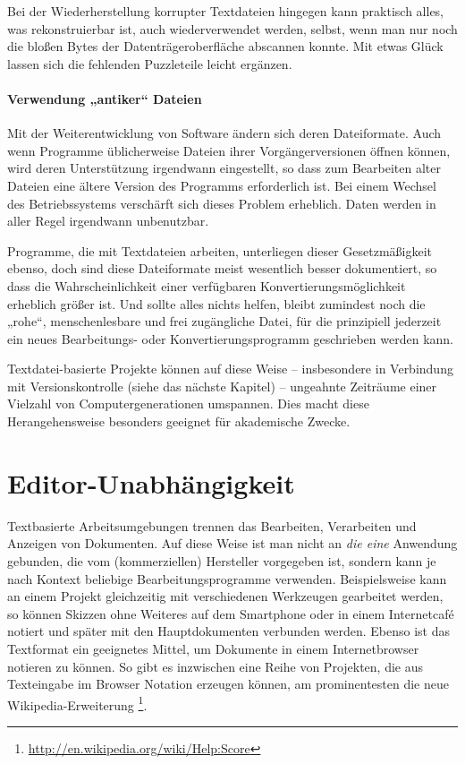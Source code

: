 \documentclass[DIV=12]{scrreprt}
\begin{document}
Bei der Wiederherstellung korrupter Textdateien hingegen kann praktisch alles, was rekonstruierbar ist, auch wiederverwendet werden, selbst, wenn man nur noch die bloßen Bytes der Datenträgeroberfläche abscannen konnte.
Mit etwas Glück lassen sich die fehlenden Puzzleteile leicht ergänzen.

\paragraph{Verwendung „antiker“ Dateien}
Mit der Weiterentwicklung von Software ändern sich deren Dateiformate.
Auch wenn Programme üblicherweise Dateien ihrer Vorgängerversionen öffnen können, wird deren Unterstützung irgendwann eingestellt, so dass zum Bearbeiten alter Dateien eine ältere Version des Programms erforderlich ist.
Bei einem Wechsel des Betriebssystems verschärft sich dieses Problem erheblich.
Daten werden in aller Regel irgendwann unbenutzbar.

Programme, die mit Textdateien arbeiten, unterliegen dieser Gesetzmäßigkeit ebenso, doch sind diese Dateiformate meist wesentlich besser dokumentiert, so dass die Wahrscheinlichkeit einer verfügbaren Konvertierungsmöglichkeit erheblich größer ist.
Und sollte alles nichts helfen, bleibt zumindest noch die „rohe“, menschenlesbare und frei zugängliche Datei, für die prinzipiell jederzeit ein neues Bearbeitungs- oder Konvertierungsprogramm geschrieben werden kann.

Textdatei-basierte Projekte können auf diese Weise -- insbesondere in Verbindung mit Versionskontrolle (siehe das nächste Kapitel) -- ungeahnte Zeiträume einer Vielzahl von Computergenerationen umspannen.
Dies macht diese Herangehensweise besonders geeignet für akademische Zwecke.

\section{Editor-Unabhängigkeit}
\label{sec:pt_editor-independence}
Textbasierte Arbeitsumgebungen trennen das Bearbeiten, Verarbeiten und Anzeigen von Dokumenten.
Auf diese Weise ist man nicht an \emph{die eine} Anwendung gebunden, die vom (kommerziellen) Hersteller vorgegeben ist, sondern kann je nach Kontext beliebige Bearbeitungsprogramme verwenden.
Beispielsweise kann an einem Projekt gleichzeitig mit verschiedenen Werkzeugen gearbeitet werden, so können Skizzen ohne Weiteres auf dem Smartphone oder in einem Internetcafé notiert und später mit den Hauptdokumenten verbunden werden.
Ebenso ist das Textformat ein geeignetes Mittel, um Dokumente in einem Internetbrowser notieren zu können.
So gibt es inzwischen eine Reihe von Projekten, die aus Texteingabe im Browser Notation erzeugen können, am prominentesten die neue Wikipedia-Erweiterung%
\footnote{\url{http://en.wikipedia.org/wiki/Help:Score}}.
\end{document}
